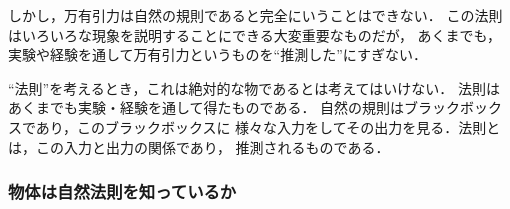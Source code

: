             しかし，万有引力は自然の規則であると完全にいうことはできない．
            この法則はいろいろな現象を説明することにできる大変重要なものだが，
            あくまでも，実験や経験を通して万有引力というものを“推測した”にすぎない．

            “法則”を考えるとき，これは絶対的な物であるとは考えてはいけない．
            法則はあくまでも実験・経験を通して得たものである．
            自然の規則はブラックボックスであり，このブラックボックスに
            様々な入力をしてその出力を見る．法則とは，この入力と出力の関係であり，
            推測されるものである．

            \subsubsection{物体は自然法則を知っているか}
